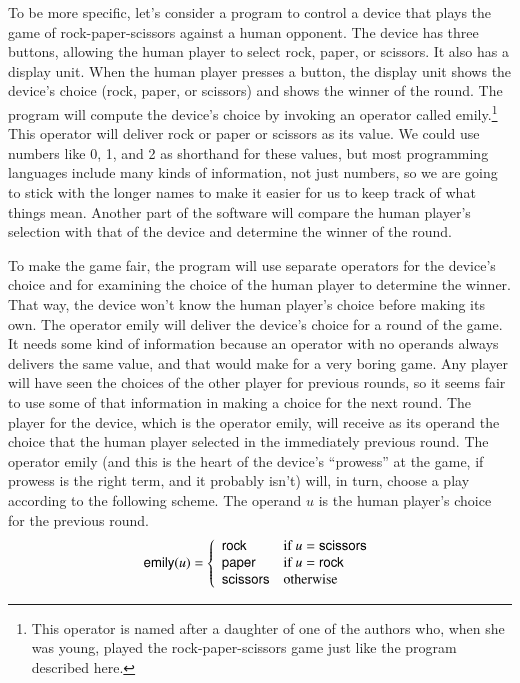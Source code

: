 To be more specific, let's consider a program to control
a device that plays the game of rock-paper-scissors against a human opponent.
The device has three buttons, allowing the human player to select rock, paper, or
scissors.  It also has a display unit.
When the human player presses a button,
the display unit shows the device's choice (rock, paper, or scissors)
and shows the winner of the round.
The program will compute the device's choice
by invoking an operator called \textsf{emily}.\footnote{This operator is
named after a daughter of one of the authors who, when she was young,
played the rock-paper-scissors game just like the program described here.}
This operator will deliver
rock or paper or scissors as its value.
We could use numbers like 0, 1, and 2 as shorthand for these values,
but most programming languages include many
kinds of information, not just numbers,
so we are going to stick with the longer names
to make it easier for us to keep track of what things mean.
Another part of the software will compare the human player's
selection with that of the device and determine the winner of the round.

To make the game fair, the program will use
separate operators for the device's choice and
for examining the choice of the human player to determine the winner.
That way, the device won't know the human player's choice before making its own.
The operator \textsf{emily} will deliver the device's choice for a round of the game.
It needs some kind of information because an operator with no operands
always delivers the same value, and that would make for a very boring game.
Any player will have seen the choices of the other player for
previous rounds, so it seems fair to use some of that information in
making a choice for the next round.
The player for the device, which is the operator \textsf{emily},
will receive as its operand the choice that the human player selected
in the immediately previous round.
The operator \textsf{emily}
(and this is the heart of the device's ``prowess''
at the game, if prowess is the right term, and it probably isn't)
will, in turn, choose a play according to the following scheme.
The operand $u$ is the human player's choice for the previous round.
\begin{displaymath}
\textsf{emily}(u) =
   \left\{
        \begin{array}{ll}
        \mbox{\textsf{rock}}     & \mbox{if } u = \mbox{\textsf{scissors}} \\
        \mbox{\textsf{paper}}    & \mbox{if } u = \mbox{\textsf{rock}} \\
        \mbox{\textsf{scissors}} & \mbox{otherwise}
        \end{array}
   \right.
\end{displaymath}

